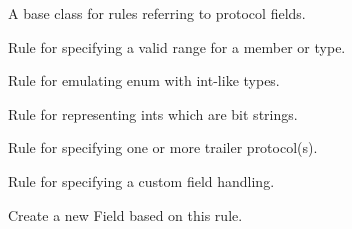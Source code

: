 \documentclass[A4paper,10pt,english]{sphinxmanual}
\begin{document}
\begin{fulllineitems}
\label{devel/code:config.BaseRule}
A base class for rules referring to protocol fields.

\end{fulllineitems}


\begin{fulllineitems}
\label{devel/code:config.Range}
Rule for specifying a valid range for a member or type.

\end{fulllineitems}


\begin{fulllineitems}
\label{devel/code:config.Enum}
Rule for emulating enum with int-like types.

\end{fulllineitems}


\begin{fulllineitems}
\label{devel/code:config.Bitstring}
Rule for representing ints which are bit strings.

\end{fulllineitems}


\begin{fulllineitems}
\label{devel/code:config.Trailer}
Rule for specifying one or more trailer protocol(s).

\end{fulllineitems}


\begin{fulllineitems}
\label{devel/code:config.Custom}
Rule for specifying a custom field handling.

\begin{fulllineitems}
\label{devel/code:config.Custom.create}
Create a new Field based on this rule.

\end{fulllineitems}


\end{fulllineitems}
\end{document}
